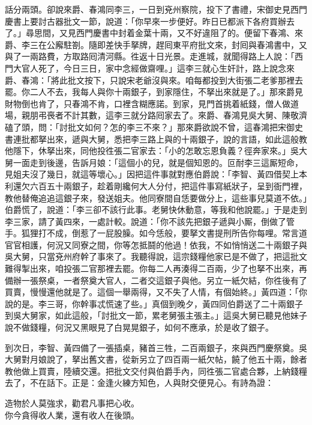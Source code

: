 話分兩頭。卻說來爵、春鴻同李三，一日到兗州察院，投下了書禮，宋御史見西門慶書上要討古器批文一節，說道：「你早來一步便好。昨日已都派下各府買辦去了。」尋思間，又見西門慶書中封着金葉十兩，又不好違阻了的。便留下春鴻、來爵、李三在公廨駐劄。隨即差快手拏牌，趕囘東平府批文來，封囘與春鴻書中，又與了一兩路費，方取路囘清河縣。徃返十日光景。走進城，就聞得路上人說：「西門大官人死了，今日三日，家中念經做齋哩。」這李三就心生奸計，路上說念來爵、春鴻：「將此批文按下，只說宋老爺沒與來。咱每都投到大街張二老爹那裡去罷。{}你二人不去，我每人與你十兩銀子，到家隱住，不拏出來就是了。」那來爵見財物倒也肯了，只春鴻不肯，口裡含糊應諾。{}到家，見門首挑着紙錢，僧人做道場，親朋弔䘮者不計其數，這李三就分路囘家去了。來爵、春鴻見吳大舅、陳敬濟磕了頭，問：「討批文如何？怎的李三不來？」那來爵欲說不曾，這春鴻把宋御史書連批都拏出來，遞與大舅，悉把李三路上與的十兩銀子，說的言語，如此這般教他隱下，休拏出來，同他投徃張二官家去：「小的怎敢忘恩負義？徑奔家來。」吳大舅一面走到後邊，告訴月娘：「這個小的兒，就是個知恩的。叵耐李三這厮短命，見姐夫沒了幾日，就這等壞心。」{}因把這件事就對應伯爵說：「李智、黃四借契上本利還欠六百五十兩銀子，趁着剛纔何大人分付，把這件事寫紙狀子，呈到衙門裡，教他替俺追追這銀子來，發送姐夫。他同寮間自恁要做分上，這些事兒莫道不依。」伯爵慌了，說道：「李三卻不該行此事。老舅快休動意，等我和他說罷。」于是走到李三家，請了黃四來，一處計較。說道：「你不該先把銀子遞與小厮，倒做了管手。狐狸打不成，倒惹了一屁股臊。如今恁般，要拏文書提刑所告你每哩。常言道官官相護，何況又同寮之間，你等怎抵鬪的他過！依我，不如悄悄送二十兩銀子與吳大舅，只當兗州府幹了事來了。我聽得說，這宗錢糧他家已是不做了，把這批文難得掣出來，咱投張二官那裡去罷。你每二人再湊得二百兩，少了也拏不出來，再備辦一張祭桌，一者祭奠大官人，二者交這銀子與他。另立一紙欠結，你徃後有了買賣，慢慢還他就是了。這個一舉兩得，又不失了人情，有個始終。」{}黃四道：「你說的是。李三哥，你幹事忒慌速了些。」真個到晚夕，黃四同伯爵送了二十兩銀子到吳大舅家，如此這般，「討批文一節，累老舅張主張主。」這吳大舅已聽見他妹子說不做錢糧，何況又黑眼見了白晃晃銀子，如何不應承，於是收了銀子。

到次日，李智、黃四備了一張插桌，豬首三牲，二百兩銀子，來與西門慶祭奠。吳大舅對月娘說了，拏出舊文書，從新另立了四百兩一紙欠帖，饒了他五十兩，餘者教他做上買賣，陸續交還。把批文交付與伯爵手內，同徃張二官處合夥，上納錢糧去了，不在話下。正是：金逢火練方知色，人與財交便見心。有詩為證：

\begin{myquote} 
造物於人莫強求，勸君凡事把心收。\\你今貪得收人業，還有收人在後頭。{}
\end{myquote} 

